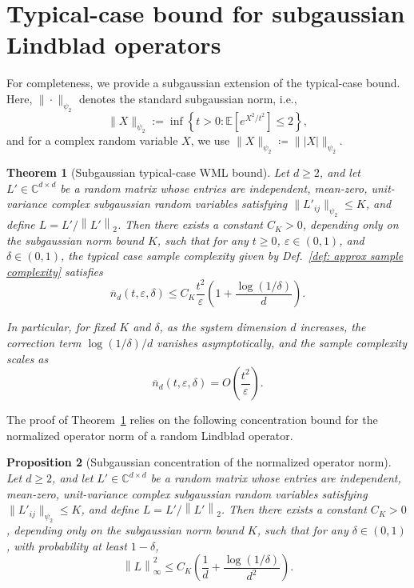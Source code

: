 \documentclass[superscriptaddress,amsmath,amssymb,aps,pra,letterpaper,tightenlines,notitlepages,12pt]{revtex4-2}
\newtheorem{theorem}{Theorem}
\newtheorem{proposition}[theorem]{Proposition}
\begin{document}
\section{Typical-case bound for subgaussian Lindblad operators}
\label{app:subgaussian-average-case}
For completeness, we provide a subgaussian extension of the typical-case bound. Here, $\|\cdot\|_{\psi_2}$ denotes the standard subgaussian norm, i.e.,
\begin{equation}
    \|X\|_{\psi_2} :=
\inf\left\{
t>0 :
\mathbb{E}\!\left[e^{X^2/t^2}\right]\le 2
\right\},
\end{equation} and for a complex random variable $X$, we use $\|X\|_{\psi_2}\coloneqq \||X|\|_{\psi_2}$.
\begin{theorem}[Subgaussian typical-case WML bound]
\label{thm:subgaussian-average-case-WML}
Let $d\ge2$, and let $L'\in\mathbb C^{d\times d}$ be a random matrix whose entries are independent, mean-zero, unit-variance complex subgaussian random variables satisfying $\|L'_{ij}\|_{\psi_2}\le K$, and define $L = L' / \left\|L'\right\|_2$.
Then there exists a constant $C_K>0$, depending only on the subgaussian norm bound $K$, such that for any $t\ge0$, $\varepsilon\in(0,1)$, and $\delta\in(0,1)$, the typical case sample complexity given by Def.~\ref{def: approx sample complexity} satisfies
\begin{equation}
    \overline{n}_d(t,\varepsilon,\delta) \le C_K \frac{t^2}{\varepsilon} \left(1 + \frac{\log(1/\delta)}{d}\right).
\end{equation}

In particular, for fixed $K$ and $\delta$, as the system dimension $d$ increases, the correction term $\log(1/\delta)/d$ vanishes asymptotically, and the sample complexity scales as
\begin{equation}
\overline{n}_d(t,\varepsilon,\delta) = O\!\left(\frac{t^2}{\varepsilon}\right).
\end{equation}
\end{theorem}
The proof of Theorem~\ref{thm:subgaussian-average-case-WML} relies on the following concentration bound for the normalized operator norm of a random Lindblad operator.

\begin{proposition}[Subgaussian concentration of the normalized operator norm]
\label{prop:subgaussian-concentration}
Let $d\ge2$, and let $L' \in \mathbb{C}^{d \times d}$ be a random matrix whose entries are independent, mean-zero, unit-variance complex subgaussian random variables satisfying $\|L'_{ij}\|_{\psi_2}\le K$, and define $L = L' / \left\|L'\right\|_2$. 
Then there exists a constant $C_K>0$, depending only on the subgaussian norm bound $K$, such that for any $\delta\in(0,1)$, with probability at least $1-\delta$,
\begin{equation}
\left\|L\right\|_\infty^2 \le C_K \left( \frac{1}{d} + \frac{\log(1/\delta)}{d^2} \right).
\end{equation}
\end{proposition}
\end{document}
